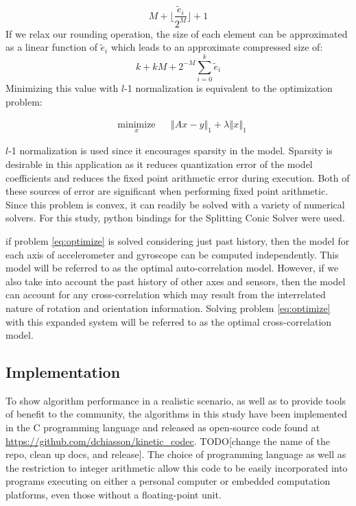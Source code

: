 \documentclass[journal]{IEEEtran}
\begin{document}
$$ M + \lfloor\frac{\tilde{e}_i}{2^M}\rfloor + 1$$
If we relax our rounding operation, the size of each element can be approximated as a linear function of $\tilde{e}_i$ which leads to an approximate compressed size of:
 $$k+kM+ 2^{-M}\sum_{i=0}^k \tilde{e}_i$$
 Minimizing this value with $l$-1 normalization is equivalent to the optimization problem:
 
\begin{equation}
\begin{aligned}
& \underset{x}{\text{minimize}}
& & \left\Vert Ax-y \right\Vert_1 + \lambda\left\Vert x \right\Vert_1
\label{eq:optimize}
\end{aligned}
\end{equation}

$l$-1 normalization is used since it encourages sparsity in the model. Sparsity is desirable in this application as it reduces quantization error of the model coefficients and reduces the fixed point arithmetic error during execution. Both of these sources of error are significant when performing fixed point arithmetic. Since this problem is convex, it can readily be solved with a variety of numerical solvers. For this study, python bindings for the Splitting Conic Solver were used\cite{ocpb:16}\cite{scs}\cite{cvxpy}.

if problem \eqref{eq:optimize} is solved considering just past history, then the model for each axis of accelerometer and gyroscope can be computed independently. This model will be referred to as the optimal auto-correlation model. However, if we also take into account the past history of other axes and sensors, then the model can account for any cross-correlation which may result from the interrelated nature of rotation and orientation information. Solving problem \eqref{eq:optimize} with this expanded system will be referred to as the optimal cross-correlation model.

\subsection{Implementation}

To show algorithm performance in a realistic scenario, as well as to provide tools of benefit to the community, the algorithms in this study have been implemented in the C programming language and released as open-source code found at \url{https://github.com/dchiasson/kinetic_codec}. TODO[change the name of the repo, clean up docs, and release]. The choice of programming language as well as the restriction to integer arithmetic allow this code to be easily incorporated into programs executing on either a personal computer or embedded computation platforms, even those without a floating-point unit.
\end{document}
